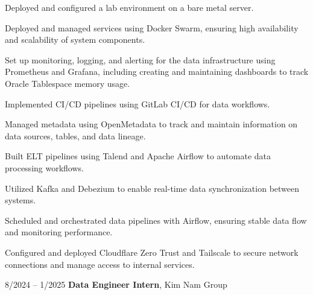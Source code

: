 \begin{onecolentry}
    \begin{highlights}
        \item Deployed and configured a lab environment on a bare metal server.
        \item Deployed and managed services using Docker Swarm, ensuring high availability and scalability of system components.
        \item Set up monitoring, logging, and alerting for the data infrastructure using Prometheus and Grafana, including creating and maintaining dashboards to track Oracle Tablespace memory usage.
        \item Implemented CI/CD pipelines using GitLab CI/CD for data workflows.
        \item Managed metadata using OpenMetadata to track and maintain information on data sources, tables, and data lineage.
        \item Built ELT pipelines using Talend and Apache Airflow to automate data processing workflows.
        \item Utilized Kafka and Debezium to enable real-time data synchronization between systems.
        \item Scheduled and orchestrated data pipelines with Airflow, ensuring stable data flow and monitoring performance.
        \item Configured and deployed Cloudflare Zero Trust and Tailscale to secure network connections and manage access to internal services.
    \end{highlights}
\end{onecolentry}
\vspace{0.2 cm}

\begin{twocolentry}{8/2024 – 1/2025}
    \textbf{Data Engineer Intern}, Kim Nam Group
\end{twocolentry}

